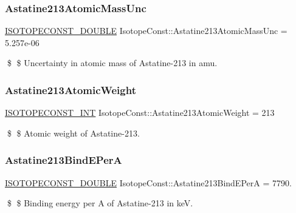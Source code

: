 \subsubsection{\texorpdfstring{Astatine213\+Atomic\+Mass\+Unc}{Astatine213AtomicMassUnc}}
{\footnotesize\ttfamily \mbox{\hyperlink{group___isotope_const-_macros_ga8f45a7272ce02c0b4c65c44636ed719a}{I\+S\+O\+T\+O\+P\+E\+C\+O\+N\+S\+T\+\_\+\+D\+O\+U\+B\+LE}} Isotope\+Const\+::\+Astatine213\+Atomic\+Mass\+Unc = 5.\+257e-\/06}

\$ \$ Uncertainty in atomic mass of Astatine-\/213 in amu. \mbox{\label{group___isotope_const-_astatine-_at213_ga0c6b9fcad7d6a31eb6e63dac6ccd36b6}} 
\subsubsection{\texorpdfstring{Astatine213\+Atomic\+Weight}{Astatine213AtomicWeight}}
{\footnotesize\ttfamily \mbox{\hyperlink{group___isotope_const-_macros_ga5f18360b3e99483a35c32d789e62621c}{I\+S\+O\+T\+O\+P\+E\+C\+O\+N\+S\+T\+\_\+\+I\+NT}} Isotope\+Const\+::\+Astatine213\+Atomic\+Weight = 213}

\$ \$ Atomic weight of Astatine-\/213. \mbox{\label{group___isotope_const-_astatine-_at213_ga05d28b490d16c9f1291be70dd8ff22bc}} 
\subsubsection{\texorpdfstring{Astatine213\+Bind\+E\+PerA}{Astatine213BindEPerA}}
{\footnotesize\ttfamily \mbox{\hyperlink{group___isotope_const-_macros_ga8f45a7272ce02c0b4c65c44636ed719a}{I\+S\+O\+T\+O\+P\+E\+C\+O\+N\+S\+T\+\_\+\+D\+O\+U\+B\+LE}} Isotope\+Const\+::\+Astatine213\+Bind\+E\+PerA = 7790.}

\$ \$ Binding energy per A of Astatine-\/213 in keV. \mbox{\label{group___isotope_const-_astatine-_at213_gadaec15629a6b3064b1c72adde48356cb}} 

